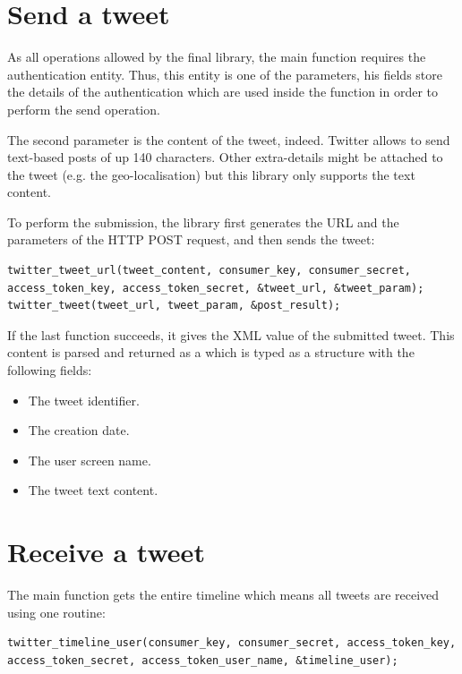 \section{Send a tweet}

\hspace{15mm}As all operations allowed by the final library, the main function requires the authentication entity. Thus, this entity is one of the parameters, his fields store the details of the authentication which are used inside the function in order to perform the send operation.

The second parameter is the content of the tweet, indeed. Twitter allows to send text-based posts of up 140 characters. Other extra-details might be attached to the tweet (e.g. the geo-localisation) but this library only supports the text content.

To perform the submission, the library first generates the URL and the parameters of the HTTP POST request, and then sends the tweet:
\begin{lstlisting}
twitter_tweet_url(tweet_content, consumer_key, consumer_secret, access_token_key, access_token_secret, &tweet_url, &tweet_param);
twitter_tweet(tweet_url, tweet_param, &post_result);
\end{lstlisting}

If the last function succeeds, it gives the XML value of the submitted tweet. This content is parsed and returned as a  which is typed as a structure with the following fields:
\begin{itemize}
\item The tweet identifier.
\item The creation date.
\item The user screen name.
\item The tweet text content.
\end{itemize}


\section{Receive a tweet}

\hspace{15mm}The main function gets the entire timeline which means all tweets are received using one routine:
\begin{lstlisting}
twitter_timeline_user(consumer_key, consumer_secret, access_token_key, access_token_secret, access_token_user_name, &timeline_user);
\end{lstlisting}

